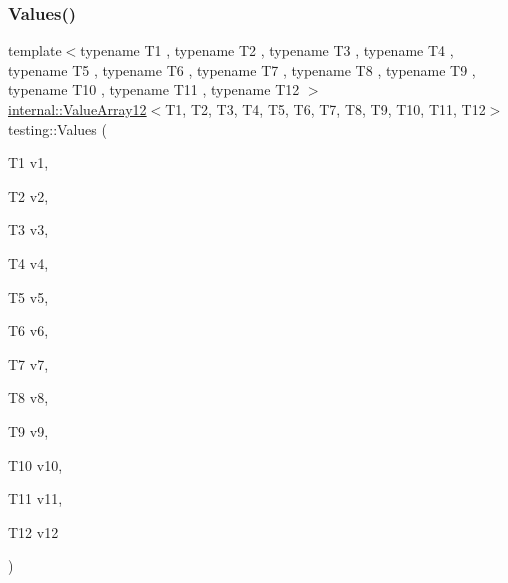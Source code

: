 \subsubsection{\texorpdfstring{Values()}{Values()}\hspace{0.1cm}{\footnotesize\ttfamily [12/50]}}
{\footnotesize\ttfamily template$<$typename T1 , typename T2 , typename T3 , typename T4 , typename T5 , typename T6 , typename T7 , typename T8 , typename T9 , typename T10 , typename T11 , typename T12 $>$ \\
\mbox{\hyperlink{classtesting_1_1internal_1_1ValueArray12}{internal\+::\+Value\+Array12}}$<$T1, T2, T3, T4, T5, T6, T7, T8, T9, T10, T11, T12$>$ testing\+::\+Values (\begin{DoxyParamCaption}\item[{T1}]{v1,  }\item[{T2}]{v2,  }\item[{T3}]{v3,  }\item[{T4}]{v4,  }\item[{T5}]{v5,  }\item[{T6}]{v6,  }\item[{T7}]{v7,  }\item[{T8}]{v8,  }\item[{T9}]{v9,  }\item[{T10}]{v10,  }\item[{T11}]{v11,  }\item[{T12}]{v12 }\end{DoxyParamCaption})}

\mbox{\label{namespacetesting_aa13a09e043383c947042ba726d25d47c}} 
